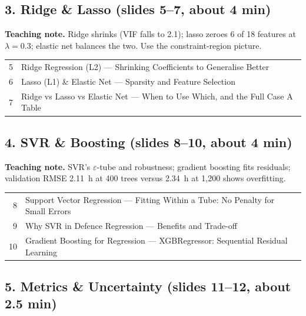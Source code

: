 \documentclass[11pt]{article}
\begin{document}
\subsection{3. Ridge \& Lasso \normalfont\small\color{GreyN}(slides 5--7, about 4 min)}

\textbf{Teaching note.} Ridge shrinks (VIF falls to 2.1); lasso zeroes 6 of 18 features at $\lambda=0.3$; elastic net balances the two. Use the constraint-region picture.

\begin{center}\small\renewcommand{\arraystretch}{1.1}\begin{tabularx}{\textwidth}{@{}r X@{}}5 & Ridge Regression (L2) --- Shrinking Coefficients to Generalise Better\\
6 & Lasso (L1) \& Elastic Net --- Sparsity and Feature Selection\\
7 & Ridge vs Lasso vs Elastic Net --- When to Use Which, and the Full Case A Table\\\end{tabularx}\end{center}

\subsection{4. SVR \& Boosting \normalfont\small\color{GreyN}(slides 8--10, about 4 min)}

\textbf{Teaching note.} SVR's $\varepsilon$-tube and robustness; gradient boosting fits residuals; validation RMSE 2.11~h at 400 trees versus 2.34~h at 1,200 shows overfitting.

\begin{center}\small\renewcommand{\arraystretch}{1.1}\begin{tabularx}{\textwidth}{@{}r X@{}}8 & Support Vector Regression --- Fitting Within a Tube: No Penalty for Small Errors\\
9 & Why SVR in Defence Regression --- Benefits and Trade-off\\
10 & Gradient Boosting for Regression --- XGBRegressor: Sequential Residual Learning\\\end{tabularx}\end{center}

\subsection{5. Metrics \& Uncertainty \normalfont\small\color{GreyN}(slides 11--12, about 2.5 min)}
\end{document}
